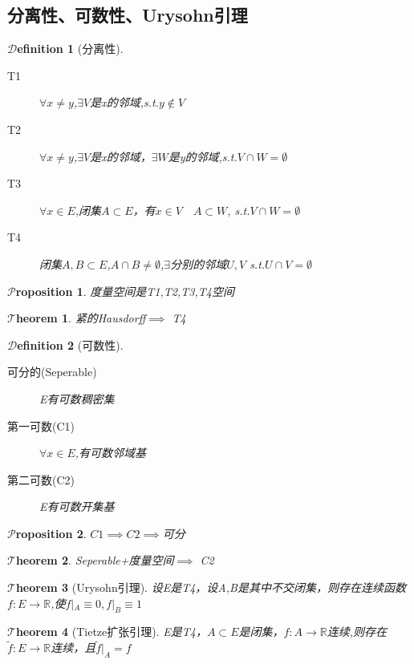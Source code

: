 \documentclass[hyperfer,UTF8,a4paper,12pt]{article}
\theoremstyle{plain}
\newtheorem{Thm}{$\mathcal{T}$heorem}
\newtheorem*{Prop}{$\mathcal{P}$roposition}
\newtheorem{Def}{{$\mathcal{D}$efinition}}[section]
\begin{document}
\subsection{分离性、可数性、Urysohn引理}
\begin{Def}[分离性]
	\hspace*{\fill}
	\begin{description}
		\item[T1]$ \forall x\not=y $,$\exists V $是x的邻域,s.t.$ y\not\in V$
		\item[T2]$ \forall x\not=y $,$\exists V $是x的邻域，$\exists W $是y的邻域,s.t.$ V\cap W=\emptyset$
		\item[T3]$ \forall x\in E $,闭集$ A\subset E $，有$ x\in V\quad A\subset W $, s.t.$ V\cap W=\emptyset$
		\item[T4] 闭集$ A,B\subset E $,$ A\cap B\not=\emptyset $,$ \exists  $分别的邻域$ U,V $ s.t.$ U\cap V=\emptyset$
	\end{description}
\end{Def}
\begin{Prop}
	度量空间是T1,T2,T3,T4空间
\end{Prop}

\begin{Thm}
	紧的Hausdorff$ \implies $ T4
\end{Thm}
\begin{Def}[可数性]
	\hspace*{\fill}
	\begin{description}
		\item[可分的(Seperable)] E有可数稠密集
		\item[第一可数(C1)]	$ \forall x\in E $,有可数邻域基
		\item[第二可数(C2)]	E有可数开集基
	\end{description}
\end{Def}

\begin{Prop}
	$ C1\implies C2\implies  $可分
\end{Prop}

\begin{Thm}
	Seperable+度量空间$ \implies $ C2
\end{Thm}

\begin{Thm}[Urysohn引理]
	设E是T4，设A,B是其中不交闭集，则存在连续函数$ f:E\to\mathbb{R} $,使$ f|_A\equiv 0,f|_B\equiv 1$
\end{Thm}

\begin{Thm}[Tietze扩张引理]
	E是T4，$ A\subset E$是闭集，$ f:A\to\mathbb{R} $连续,则存在$ \tilde{f}:E\to\mathbb{R} $连续，且$ \tilde{f}|_A=f $
\end{Thm}
\end{document}
